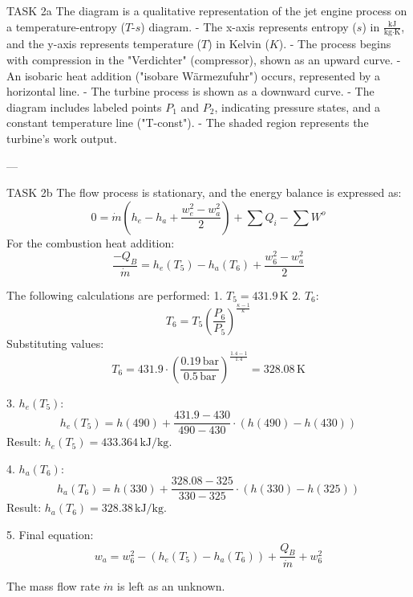TASK 2a  
The diagram is a qualitative representation of the jet engine process on a temperature-entropy (\( T \)-\( s \)) diagram.  
- The x-axis represents entropy (\( s \)) in \( \frac{\text{kJ}}{\text{kg·K}} \), and the y-axis represents temperature (\( T \)) in Kelvin (\( K \)).  
- The process begins with compression in the "Verdichter" (compressor), shown as an upward curve.  
- An isobaric heat addition ("isobare Wärmezufuhr") occurs, represented by a horizontal line.  
- The turbine process is shown as a downward curve.  
- The diagram includes labeled points \( P_1 \) and \( P_2 \), indicating pressure states, and a constant temperature line ("T-const").  
- The shaded region represents the turbine's work output.  

---

TASK 2b  
The flow process is stationary, and the energy balance is expressed as:  
\[
0 = \dot{m} \left( h_e - h_a + \frac{w_e^2 - w_a^2}{2} \right) + \sum Q_i - \sum W^o
\]  
For the combustion heat addition:  
\[
\frac{-Q_B}{\dot{m}} = h_e(T_5) - h_a(T_6) + \frac{w_6^2 - w_a^2}{2}
\]  

The following calculations are performed:  
1. \( T_5 = 431.9 \, \text{K} \)  
2. \( T_6 \):  
\[
T_6 = T_5 \left( \frac{P_6}{P_5} \right)^{\frac{\kappa - 1}{\kappa}}  
\]  
Substituting values:  
\[
T_6 = 431.9 \cdot \left( \frac{0.19 \, \text{bar}}{0.5 \, \text{bar}} \right)^{\frac{1.4 - 1}{1.4}} = 328.08 \, \text{K}
\]  

3. \( h_e(T_5) \):  
\[
h_e(T_5) = h(490) + \frac{431.9 - 430}{490 - 430} \cdot \left( h(490) - h(430) \right)  
\]  
Result: \( h_e(T_5) = 433.364 \, \text{kJ/kg} \).  

4. \( h_a(T_6) \):  
\[
h_a(T_6) = h(330) + \frac{328.08 - 325}{330 - 325} \cdot \left( h(330) - h(325) \right)  
\]  
Result: \( h_a(T_6) = 328.38 \, \text{kJ/kg} \).  

5. Final equation:  
\[
w_a = w_6^2 - \left( h_e(T_5) - h_a(T_6) \right) + \frac{Q_B}{\dot{m}} + w_6^2
\]  

The mass flow rate \( \dot{m} \) is left as an unknown.
